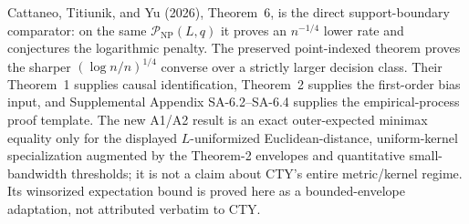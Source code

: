 Cattaneo, Titiunik, and Yu (2026), Theorem~6, is the direct support-boundary comparator: on the same \(\mathcal P_{\mathrm{NP}}(L,q)\) it proves an \(n^{-1/4}\) lower rate and conjectures the logarithmic penalty.  The preserved point-indexed theorem proves the sharper \((\log n/n)^{1/4}\) converse over a strictly larger decision class.  Their Theorem~1 supplies causal identification, Theorem~2 supplies the first-order bias input, and Supplemental Appendix SA-6.2--SA-6.4 supplies the empirical-process proof template.  The new A1/A2 result is an exact outer-expected minimax equality only for the displayed \(L\)-uniformized Euclidean-distance, uniform-kernel specialization augmented by the Theorem-2 envelopes and quantitative small-bandwidth thresholds; it is not a claim about CTY's entire metric/kernel regime.  Its winsorized expectation bound is proved here as a bounded-envelope adaptation, not attributed verbatim to CTY.